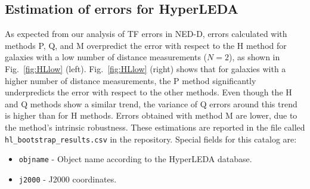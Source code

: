 \documentclass[a4paper,fleqn,usenatbib]{mnras}
\begin{document}
\subsection{Estimation of errors for HyperLEDA}
As expected from our analysis of TF errors in NED-D, errors calculated with methods P, Q, and M overpredict the error with respect to the H method for galaxies with a low number of distance measurements ($N=2$), as shown in Fig.~\ref{fig:HLlow} (left). Fig.~\ref{fig:HLlow} (right) shows that for galaxies with a higher number of distance measurements, the P method significantly underpredicts the error with respect to the other methods. Even though the H and Q methods show a similar trend, the variance of Q errors around this trend is higher than for H methods. Errors obtained with method M are lower, due to the method's intrinsic robustness. These estimations are reported in the file called \texttt{hl\_bootstrap\_results.csv} in the repository. Special fields for this catalog are:
\begin{itemize}
\item \texttt{objname} - Object name according to the HyperLEDA database.
\item \texttt{j2000} - J2000 coordinates.
\end{itemize}
\end{document}
